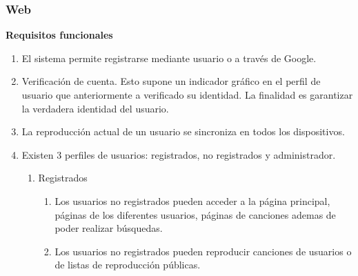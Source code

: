 \documentclass[12pt]{article}%
\begin{document}
\subsubsection{Web}
	
\textbf{Requisitos funcionales}
\begin{enumerate}
	\item El sistema permite registrarse mediante usuario o a trav\'es de Google.
	\item Verificaci\'on de cuenta. Esto supone un indicador gr\'afico en el perfil de usuario que anteriormente a verificado su identidad. La finalidad es garantizar la verdadera identidad del usuario.
	\item La reproducci\'on actual de un usuario se sincroniza en todos los dispositivos.
	
	\item Existen 3 perfiles de usuarios: registrados, no registrados y administrador.
	\begin{enumerate}
		\item Registrados
		\begin{enumerate}
			\item Los usuarios no registrados pueden acceder a la p\'agina principal, p\'aginas de los diferentes usuarios, p\'aginas de canciones ademas de poder realizar b\'usquedas.
			\item Los usuarios no registrados pueden reproducir canciones de usuarios o de listas de reproducci\'on p\'ublicas.
			

\end{enumerate}
\end{enumerate}
\end{enumerate}
\end{document}

